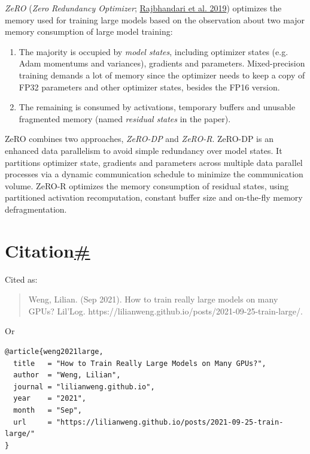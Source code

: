 \emph{ZeRO} (\emph{Zero Redundancy Optimizer}; \href{https://arxiv.org/abs/1910.02054}{Rajbhandari et al. 2019}) optimizes the memory used for training large models based on the observation about two major memory consumption of large model training:

\begin{enumerate}
\tightlist
\item
  The majority is occupied by \emph{model states}, including optimizer states (e.g. Adam momentums and variances), gradients and parameters. Mixed-precision training demands a lot of memory since the optimizer needs to keep a copy of FP32 parameters and other optimizer states, besides the FP16 version.
\item
  The remaining is consumed by activations, temporary buffers and unusable fragmented memory (named \emph{residual states} in the paper).
\end{enumerate}

ZeRO combines two approaches, \emph{ZeRO-DP} and \emph{ZeRO-R}. ZeRO-DP is an enhanced data parallelism to avoid simple redundancy over model states. It partitions optimizer state, gradients and parameters across multiple data parallel processes via a dynamic communication schedule to minimize the communication volume. ZeRO-R optimizes the memory consumption of residual states, using partitioned activation recomputation, constant buffer size and on-the-fly memory defragmentation.

\section{\texorpdfstring{Citation\hyperref[citation]{\#}}{Citation\#}}\label{citation}

Cited as:

\begin{quote}
Weng, Lilian. (Sep 2021). How to train really large models on many GPUs? Lil'Log. https://lilianweng.github.io/posts/2021-09-25-train-large/.
\end{quote}

Or

\begin{verbatim}
@article{weng2021large,
  title   = "How to Train Really Large Models on Many GPUs?",
  author  = "Weng, Lilian",
  journal = "lilianweng.github.io",
  year    = "2021",
  month   = "Sep",
  url     = "https://lilianweng.github.io/posts/2021-09-25-train-large/"
}
\end{verbatim}

